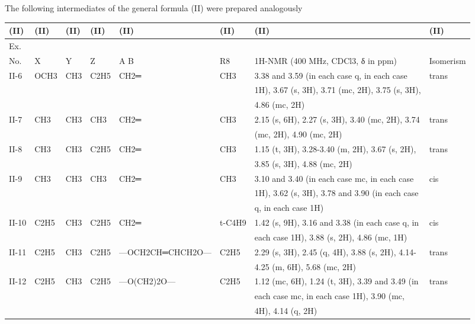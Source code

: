 \documentclass[11pt,a4paper]{article}
\begin{document}
The following intermediates of the general formula (II) were prepared analogously

\begin{table}[h]
\begin{tabular}{|l|l|l|l|l|l|l|l|}
\hline
(II) & (II) & (II) & (II) & (II) & (II) & (II) & (II) \\ \hline
Ex. &  &  &  &  &  &  &  \\ \hline
No. & X & Y & Z & A B & R8 & 1H-NMR (400 MHz, CDCl3, δ in ppm) & Isomerism \\ \hline
II-6 & OCH3 & CH3 & C2H5 & CH2═ & CH3 & 3.38 and 3.59 (in each case q, in each case & trans \\ \hline
 &  &  &  &  &  & 1H), 3.67 (s, 3H), 3.71 (mc, 2H), 3.75 (s, 3H), &  \\ \hline
 &  &  &  &  &  & 4.86 (mc, 2H) &  \\ \hline
II-7 & CH3 & CH3 & CH3 & CH2═ & CH3 & 2.15 (s, 6H), 2.27 (s, 3H), 3.40 (mc, 2H), 3.74 & trans \\ \hline
 &  &  &  &  &  & (mc, 2H), 4.90 (mc, 2H) &  \\ \hline
II-8 & CH3 & CH3 & C2H5 & CH2═ & CH3 & 1.15 (t, 3H), 3.28-3.40 (m, 2H), 3.67 (s, 2H), & trans \\ \hline
 &  &  &  &  &  & 3.85 (s, 3H), 4.88 (mc, 2H) &  \\ \hline
II-9 & CH3 & CH3 & CH3 & CH2═ & CH3 & 3.10 and 3.40 (in each case mc, in each case & cis \\ \hline
 &  &  &  &  &  & 1H), 3.62 (s, 3H), 3.78 and 3.90 (in each case &  \\ \hline
 &  &  &  &  &  & q, in each case 1H) &  \\ \hline
II-10 & C2H5 & CH3 & C2H5 & CH2═ & t-C4H9 & 1.42 (s, 9H), 3.16 and 3.38 (in each case q, in & cis \\ \hline
 &  &  &  &  &  & each case 1H), 3.88 (s, 2H), 4.86 (mc, 1H) &  \\ \hline
II-11 & C2H5 & CH3 & C2H5 & —OCH2CH═CHCH2O— & C2H5 & 2.29 (s, 3H), 2.45 (q, 4H), 3.88 (s, 2H), 4.14- & trans \\ \hline
 &  &  &  &  &  & 4.25 (m, 6H), 5.68 (mc, 2H) &  \\ \hline
II-12 & C2H5 & CH3 & C2H5 & —O(CH2)2O— & C2H5 & 1.12 (mc, 6H), 1.24 (t, 3H), 3.39 and 3.49 (in & trans \\ \hline
 &  &  &  &  &  & each case mc, in each case 1H), 3.90 (mc, &  \\ \hline
 &  &  &  &  &  & 4H), 4.14 (q, 2H) &  \\ \hline

\end{tabular}
\end{table}
\end{document}
